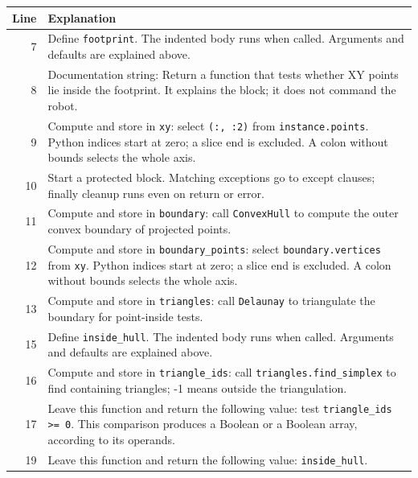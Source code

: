 \documentclass[11pt,a4paper]{book}
\begin{document}
\begin{longtable}{r p{}}

\textbf{Line} & \textbf{Explanation} \\ \hline \endhead

7 & Define \texttt{footprint}. The indented body runs when called. Arguments and defaults are explained above. \\

8 & Documentation string: Return a function that tests whether XY points lie inside the footprint. It explains the block; it does not command the robot. \\

9 & Compute and store in \texttt{xy}: select \texttt{(:, :2)} from \texttt{instance.points}. Python indices start at zero; a slice end is excluded. A colon without bounds selects the whole axis.  \\

10 & Start a protected block. Matching exceptions go to except clauses; finally cleanup runs even on return or error. \\

11 & Compute and store in \texttt{boundary}: call \texttt{ConvexHull} to compute the outer convex boundary of projected points.  \\

12 & Compute and store in \texttt{boundary\_points}: select \texttt{boundary.vertices} from \texttt{xy}. Python indices start at zero; a slice end is excluded. A colon without bounds selects the whole axis.  \\

13 & Compute and store in \texttt{triangles}: call \texttt{Delaunay} to triangulate the boundary for point-inside tests.  \\

15 & Define \texttt{inside\_hull}. The indented body runs when called. Arguments and defaults are explained above. \\

16 & Compute and store in \texttt{triangle\_ids}: call \texttt{triangles.find\_simplex} to find containing triangles; -1 means outside the triangulation.  \\

17 & Leave this function and return the following value: test \texttt{triangle\_ids >= 0}. This comparison produces a Boolean or a Boolean array, according to its operands. \\

19 & Leave this function and return the following value: \texttt{inside\_hull}. \\


\end{longtable}
\end{document}
